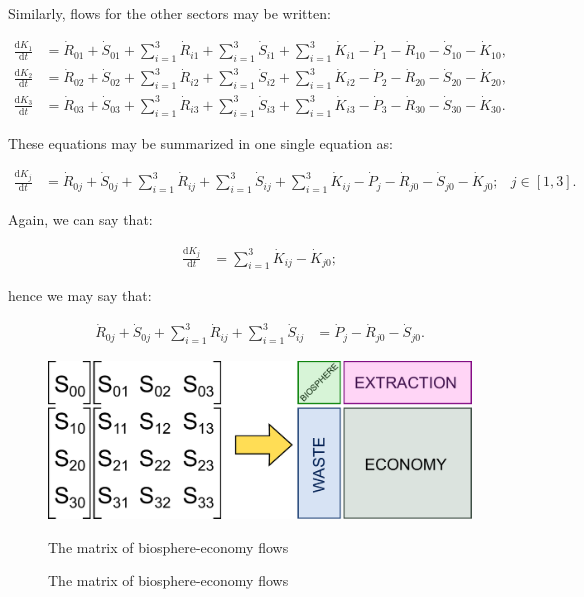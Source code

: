 Similarly, flows for the other sectors may be written:

\begin{align} \label{eq:C_CV_1_to_3}
	\frac{\mathrm{d}K_{1}}{\mathrm{d}t}		
	& =  \dot{R}_{01} 
	+ \dot{S}_{01}
	+ \sum_{i = 1}^{3}\dot{R}_{i1}
	+ \sum_{i = 1}^{3}\dot{S}_{i1}
	+ \sum_{i = 1}^{3}\dot{K}_{i1}
	- \dot{P}_{1}
	- \dot{R}_{10} 
	- \dot{S}_{10}
	- \dot{K}_{10},										\\
	\frac{\mathrm{d}K_{2}}{\mathrm{d}t}		
	& =  \dot{R}_{02} 
	+ \dot{S}_{02}
	+ \sum_{i = 1}^{3}\dot{R}_{i2}
	+ \sum_{i = 1}^{3}\dot{S}_{i2}
	+ \sum_{i = 1}^{3}\dot{K}_{i2}
	- \dot{P}_{2}
	- \dot{R}_{20} 
	- \dot{S}_{20}
	- \dot{K}_{20},										\\	
	\frac{\mathrm{d}K_{3}}{\mathrm{d}t}		
	& =  \dot{R}_{03} 
	+ \dot{S}_{03}
	+ \sum_{i = 1}^{3}\dot{R}_{i3}
	+ \sum_{i = 1}^{3}\dot{S}_{i3}
	+ \sum_{i = 1}^{3}\dot{K}_{i3}
	- \dot{P}_{3}
	- \dot{R}_{30} 
	- \dot{S}_{30}
	- \dot{K}_{30}.										
\end{align}

These equations may be summarized in one single equation as:

\begin{align} \label{eq:C_CV_1_to_3_b}
	\frac{\mathrm{d}K_{j}}{\mathrm{d}t}		
	& =  \dot{R}_{0j} 
	+ \dot{S}_{0j}
	+ \sum_{i = 1}^{3}\dot{R}_{ij}
	+ \sum_{i = 1}^{3}\dot{S}_{ij}
	+ \sum_{i = 1}^{3}\dot{K}_{ij}
	- \dot{P}_{j}
	- \dot{R}_{j0} 
	- \dot{S}_{j0}
	- \dot{K}_{j0};
	& j \in \left[1,3\right].
\end{align}

Again, we can say that:

\begin{align} \label{eq:C_CV_K_balance}
	\frac{\mathrm{d}K_{j}}{\mathrm{d}t}		
	& =  \sum_{i = 1}^{3}\dot{K}_{ij}
	- \dot{K}_{j0};
\end{align}

\noindent hence we may say that:

\begin{align} \label{eq:C_CV_1_to_3_b}
	\dot{R}_{0j} 
	+ \dot{S}_{0j}
	+ \sum_{i = 1}^{3}\dot{R}_{ij}
	+ \sum_{i = 1}^{3}\dot{S}_{ij}
	& = \dot{P}_{j}
	- \dot{R}_{j0} 
	- \dot{S}_{j0}.
\end{align}



\begin{figure}[h!]
\centering
\includegraphics[width=0.8\linewidth]{Part_1/Chapter_Materials/images/Matrix.pdf}
\caption{The matrix of biosphere-economy flows}{The matrix of biosphere-economy flows}
\label{fig:C_mat_matrix}
\end{figure}

